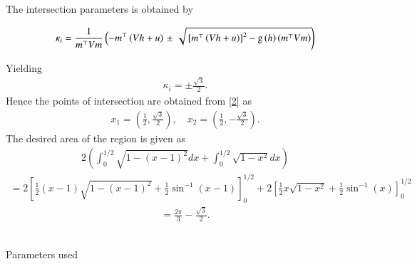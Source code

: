 \documentclass[journal]{IEEEtran}
\begin{document}
 The intersection parameters is obtained by 

    \begin{multline}
\kappa_i = \frac{1}
{
m^{\top}Vm
}
\left(-m^{\top}\left(Vh+u\right)\right.
\pm
\left.\sqrt{
{}\left[
m^{\top}\left(Vh+u\right)
\right]^2
	-\text{g}
\left(h
\right)
\left(m^{\top}Vm\right)
}
\right)
\label{13}
\end{multline}

Yielding
 \begin{align}
\kappa_i = \pm \frac{\sqrt{3}}{2}. \label{14}
 \end{align}
Hence the points of intersection are obtained from \eqref{2} as
 \begin{align}
x_1 = \left( \frac{1}{2}, \frac{\sqrt{3}}{2} \right), \quad x_2 = \left( \frac{1}{2}, -\frac{\sqrt{3}}{2} \right). \label{15}
 \end{align}
The desired area of the region is given as
 \begin{align}
2 \left( \int_0^{1/2} \sqrt{1 - (x - 1)^2} dx + \int_0^{1/2} \sqrt{1 - x^2} dx \right) \label{16}
 \end{align}
 \begin{align}
= 2 \left[ \frac{1}{2} \left( x - 1 \right) \sqrt{1 - (x - 1)^2} + \frac{1}{2} \sin^{-1}(x - 1) \right]_0^{1/2} + 2 \left[ \frac{1}{2} x \sqrt{1 - x^2} + \frac{1}{2} \sin^{-1}(x) \right]_0^{1/2} \label{17}
 \end{align}
 \begin{align}
= \frac{2\pi}{3} - \frac{\sqrt{3}}{2}. \label{18}
 \end{align}
 \\
 
 \begin{table}[h!]
    \centering
    
    \caption{Parameters used}
    \label{tab:9.5-5}
\end{table}
\\
\end{document}
